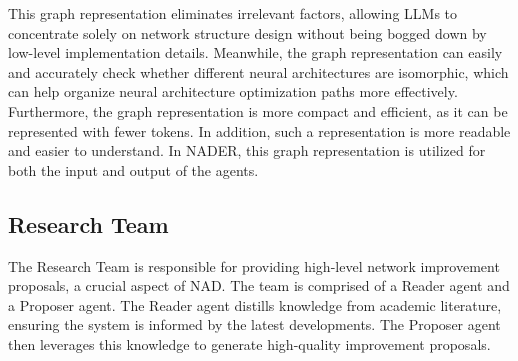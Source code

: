 This graph representation eliminates irrelevant factors, allowing LLMs to concentrate solely on network structure design without being bogged down by low-level implementation details. 
Meanwhile, the graph representation can easily and accurately check whether different neural architectures are isomorphic, which can help organize neural architecture optimization paths more effectively.
Furthermore, the graph representation is more compact and efficient, as it can be represented with fewer tokens.
In addition, such a representation is more readable and easier to understand. 
In NADER, this graph representation is utilized for both the input and output of the agents.

\subsection{Research Team}
The Research Team is responsible for providing high-level network improvement proposals, a crucial aspect of NAD. The team is comprised of a Reader agent and a Proposer agent. 
The Reader agent distills knowledge from academic literature, ensuring the system is informed by the latest developments. The Proposer agent then leverages this knowledge to generate high-quality improvement proposals.

